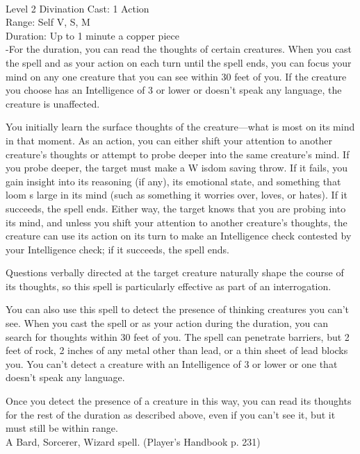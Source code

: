 \documentclass[10pt,twocolumn]{report}
\begin{document}
 \\
Level 2 \quad Divination \quad Cast: 1 Action\\
Range: Self \quad V, S, M\\
Duration: Up to 1 minute \quad a copper piece\\
-For the duration, you can read the thoughts of certain creatures. 
When you cast the spell and as your action on each turn until the spell ends, you can focus your mind on any one creature that you can see within 30 feet of you. If the creature you choose has an Intelligence of 3 or lower or doesn’t speak any language, the creature is unaffected. 

You initially learn the surface thoughts of the creature—what is most on its mind in that moment. As an action, you can either shift your attention to another creature’s thoughts or attempt to probe deeper into the same creature’s mind. If you probe deeper, the target must make a W isdom saving throw. If it fails, you gain insight into its reasoning (if any), its emotional state, and something that loom s large in its mind (such as something it worries over, loves, or hates). If it succeeds, the spell ends. Either way, the target knows that you are probing into its mind, and unless you shift your attention to another creature’s thoughts, the creature can use its action on its turn to make an Intelligence check contested by your Intelligence check; if it succeeds, the spell ends. 

Questions verbally directed at the target creature naturally shape the course of its thoughts, so this spell is particularly effective as part of an interrogation. 

You can also use this spell to detect the presence of thinking creatures you can’t see. When you cast the spell or as your action during the duration, you can search for thoughts within 30 feet of you. The spell can penetrate barriers, but 2 feet of rock, 2 inches of any metal other than lead, or a thin sheet of lead blocks you. You can’t detect a creature with an Intelligence of 3 or lower or one that doesn’t speak any language. 

Once you detect the presence of a creature in this way, you can read its thoughts for the rest of the duration as described above, even if you can’t see it, but it must still be within range.\\
A Bard, Sorcerer, Wizard spell. (Player's Handbook p. 231) \\
\end{document}
